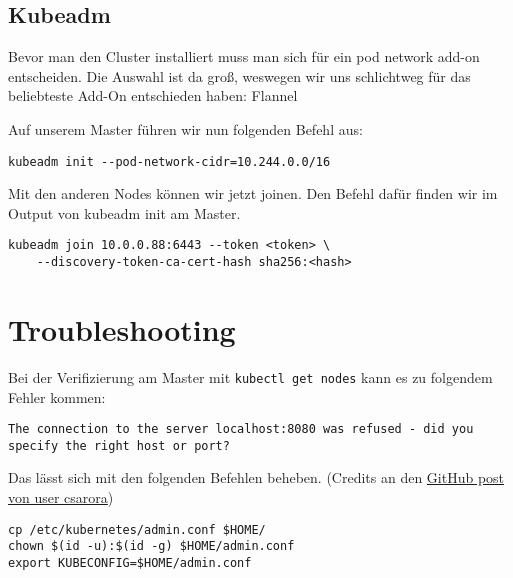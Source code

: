 \hypertarget{kubeadm}{%
\subsection{Kubeadm}\label{kubeadm}}

Bevor man den Cluster installiert muss man sich für ein pod network
add-on entscheiden. Die Auswahl ist da groß, weswegen wir uns
schlichtweg für das beliebteste Add-On entschieden haben: Flannel

Auf unserem Master führen wir nun folgenden Befehl aus:

\begin{verbatim}
kubeadm init --pod-network-cidr=10.244.0.0/16
\end{verbatim}

Mit den anderen Nodes können wir jetzt joinen. Den Befehl dafür finden
wir im Output von kubeadm init am Master.

\begin{verbatim}
kubeadm join 10.0.0.88:6443 --token <token> \
    --discovery-token-ca-cert-hash sha256:<hash>
\end{verbatim}

\hypertarget{troubleshooting}{%
\section{Troubleshooting}\label{troubleshooting}}

Bei der Verifizierung am Master mit \texttt{kubectl\ get\ nodes} kann es
zu folgendem Fehler kommen:

\begin{verbatim}
The connection to the server localhost:8080 was refused - did you specify the right host or port?
\end{verbatim}

Das lässt sich mit den folgenden Befehlen beheben. (Credits an den
\href{https://github.com/kubernetes/kubernetes/issues/44665\#issuecomment-295216655}{GitHub
post von user csarora})

\begin{verbatim}
cp /etc/kubernetes/admin.conf $HOME/
chown $(id -u):$(id -g) $HOME/admin.conf
export KUBECONFIG=$HOME/admin.conf
\end{verbatim}

